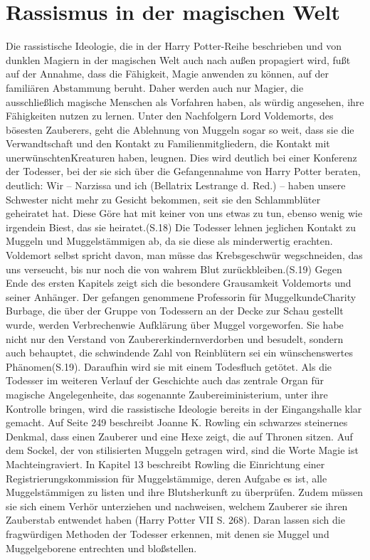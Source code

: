 \section{Rassismus in der magischen Welt}
Die rassistische Ideologie, die in der \glqq Harry Potter\grqq-Reihe beschrieben und von dunklen Magiern in der magischen Welt auch nach außen propagiert wird, fußt auf der Annahme, dass die Fähigkeit, Magie anwenden zu können, auf der familiären Abstammung beruht. Daher werden auch nur Magier, die ausschließlich magische Menschen als Vorfahren haben, als würdig angesehen, ihre Fähigkeiten nutzen zu lernen. Unter den Nachfolgern Lord Voldemorts, des bösesten Zauberers, geht die Ablehnung von Muggeln sogar so weit, dass sie die Verwandtschaft und den Kontakt zu Familienmitgliedern, die Kontakt mit \glqq unerwünschten\grqq Kreaturen haben, leugnen. Dies wird deutlich bei einer Konferenz der Todesser, bei der sie sich über die Gefangennahme von Harry Potter beraten, deutlich: \glqq Wir – Narzissa und ich (Bellatrix Lestrange d. Red.) – haben unsere Schwester nicht mehr zu Gesicht bekommen, seit sie den Schlammblüter geheiratet hat. Diese Göre hat mit keiner von uns etwas zu tun, ebenso wenig wie irgendein Biest, das sie heiratet.(S.18)\grqq
Die Todesser lehnen jeglichen Kontakt zu Muggeln und Muggelstämmigen ab, da sie diese als minderwertig erachten. Voldemort selbst spricht davon, man müsse \glqq das Krebsgeschwür wegschneiden, das uns verseucht, bis nur noch die von wahrem Blut zurückbleiben.\grqq (S.19) Gegen Ende des ersten Kapitels zeigt sich die besondere Grausamkeit Voldemorts und seiner Anhänger. Der gefangen genommene Professorin für \glqq Muggelkunde\grqq Charity Burbage, die über der Gruppe von Todessern an der Decke zur Schau gestellt wurde, werden \glqq Verbrechen\grqq wie Aufklärung über Muggel vorgeworfen. Sie habe nicht nur \glqq den Verstand von Zaubererkindern\grqq verdorben und besudelt, sondern auch behauptet, die schwindende Zahl von Reinblütern sei ein \glqq wünschenswertes Phänomen\grqq (S.19). Daraufhin wird sie mit einem Todesfluch getötet.
Als die Todesser im weiteren Verlauf der Geschichte auch das zentrale Organ für magische Angelegenheite, das sogenannte Zaubereiministerium, unter ihre Kontrolle bringen, wird die rassistische Ideologie bereits in der Eingangshalle klar gemacht. Auf Seite 249 beschreibt Joanne K. Rowling ein schwarzes steinernes Denkmal, dass einen Zauberer und eine Hexe zeigt, die auf Thronen sitzen. Auf dem Sockel, der von stilisierten Muggeln getragen wird, sind die Worte \glqq Magie ist Macht\grqq eingraviert. In Kapitel 13 beschreibt Rowling die Einrichtung einer \glqq Registrierungskommission für Muggelstämmige\grqq , deren Aufgabe es ist, alle Muggelstämmigen zu listen und ihre Blutsherkunft zu überprüfen. Zudem müssen sie sich einem Verhör unterziehen und nachweisen, welchem Zauberer sie ihren Zauberstab entwendet haben (Harry Potter VII S. 268). Daran lassen sich die fragwürdigen Methoden der Todesser erkennen, mit denen sie Muggel und Muggelgeborene entrechten und bloßstellen. 
